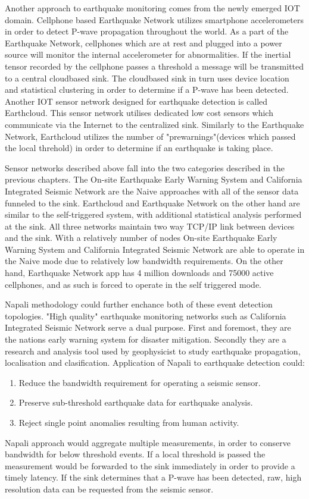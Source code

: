 Another approach to earthquake monitoring comes from the newly emerged IOT domain.
Cellphone based Earthquake Network \cite{finazzi2017statistical} utilizes smartphone accelerometers in order to detect P-wave propagation throughout the world.
As a part of the Earthquake Network, cellphones which are at rest and plugged into a power source will monitor the internal accelerometer for abnormalities.
If the inertial tensor recorded by the cellphone passes a threshold a message will be transmitted to a central cloudbased sink.
The cloudbased sink in turn uses device location and statistical clustering in order to determine if a P-wave has been detected.
Another IOT sensor network designed for earthquake detection is called Earthcloud.\cite{klapez2018first}
This sensor network utilises dedicated low cost sensors which communicate via the Internet to the centralized sink.
Similarly to the Earthquake Network, Earthcloud utilizes the number of "prewarnings"(devices which passed the local threhold) in order to determine if an earthquake is taking place.

Sensor networks described above fall into the two categories described in the previous chapters.
The On-site Earthquake Early Warning System and California Integrated Seismic Network are the Naive approaches with all of the sensor data funneled to the sink.
Earthcloud and Earthquake Network on the other hand are similar to the self-triggered system, with additional statistical analysis performed at the sink.
All three networks maintain two way TCP/IP link between devices and the sink.
With a relatively number of nodes On-site Earthquake Early Warning System and California Integrated Seismic Network are able to operate in the Naive mode due to relatively low bandwidth requirements.
On the other hand, Earthquake Network app has 4 million downloads and 75000 active cellphones, and as such is forced to operate in the self triggered mode.

Napali methodology could further enchance both of these event detection topologies.
"High quality" earthquake monitoring networks such as California Integrated Seismic Network serve a dual purpose.
First and foremost, they are the nations early warning system for disaster mitigation.
Secondly they are a research and analysis tool used by geophysicist to study earthquake propagation, localisation and clasification.
Application of Napali to earthquake detection could:
\begin{enumerate}
    \item Reduce the bandwidth requirement for operating a seismic sensor.
    \item Preserve sub-threshold earthquake data for earthquake analysis.
    \item Reject single point anomalies resulting from human activity.
\end{enumerate}
Napali approach would aggregate multiple measurements, in order to conserve bandwidth for below threshold events.
If a local threshold is passed the measurement would be forwarded to the sink immediately in order to provide a timely latency.
If the sink determines that a P-wave has been detected, raw, high resolution data can be requested from the seismic sensor.


